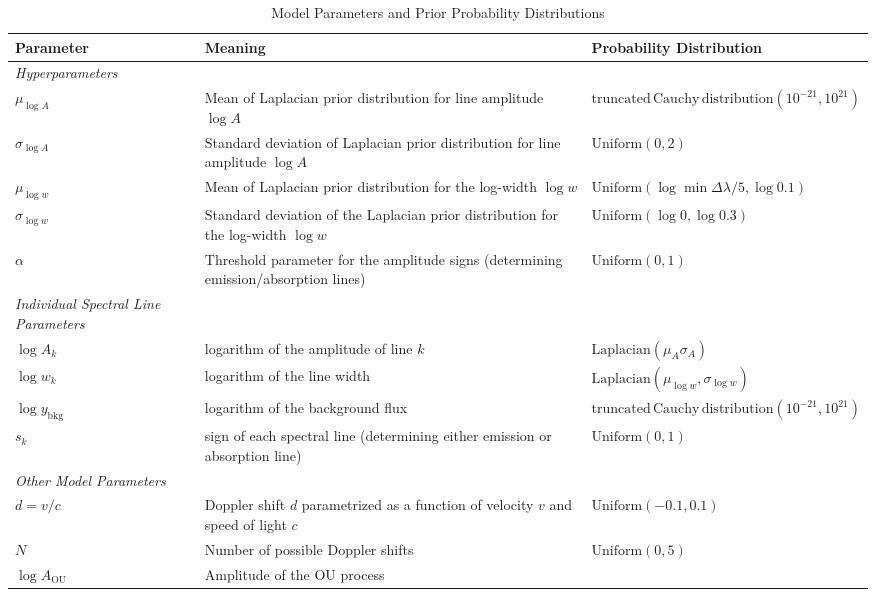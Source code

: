 \documentclass[12pt]{emulateapj}
\newcommand{\counts}{y}
\begin{document}
\begin{table*}[hbtp]
\renewcommand{\arraystretch}{1.3}
\footnotesize
\caption{Model Parameters and Prior Probability Distributions}
\begin{threeparttable} 
\begin{tabularx}{\textwidth}{p{4.0cm}p{7.0cm}X}
\toprule
\bf{Parameter} & \bf{Meaning} & \bf{Probability Distribution} \\ \midrule
\it{Hyperparameters} && \\ \midrule
$\mu_{\log{A}}$ & Mean of Laplacian prior distribution for line amplitude $\log{A}$ &   $\mathrm{truncated\, Cauchy\, distribution}(10^{-21}, 10^{21})$  \\
$\sigma_{\log{A}}$ & Standard deviation of Laplacian prior distribution for line amplitude $\log{A}$ & $\mathrm{Uniform}(0,2)$ \\
$\mu_{\log{w}}$ & Mean of Laplacian prior distribution for the log-width $\log{w}$ & $\mathrm{Uniform}(\log{\min{\Delta\lambda}/5}, \log{0.1})$  \\
$\sigma_{\log{w}}$ & Standard deviation of the Laplacian prior distribution for the log-width $\log{w}$ & $\mathrm{Uniform}(\log{0}, \log{0.3})$\\ 
$\alpha$ & Threshold parameter for the amplitude signs (determining emission/absorption lines) &  $\mathrm{Uniform}(0,1)$\\
\midrule
\it{Individual Spectral Line Parameters} && \\ \midrule
$\log{A_k}$ & logarithm of the amplitude of line $k$ & $\mathrm{Laplacian}(\mu_A \sigma_A)$ \\
$\log{w_k}$ & logarithm of the line width & $\mathrm{Laplacian}(\mu_{\log{w}}, \sigma_{\log{w}})$ \\
$\log{\counts}_{\mathrm{bkg}}$ & logarithm of the background flux & $\mathrm{truncated\, Cauchy\, distribution}(10^{-21}, 10^{21})$ \\
$s_k$ & sign of each spectral line (determining either emission or absorption line) &  $\mathrm{Uniform}(0,1)$\\
\midrule
\it{Other Model Parameters} && \\ \midrule
$d = v/c$ & Doppler shift $d$ parametrized as a function of velocity $v$ and speed of light $c$ & $\mathrm{Uniform}(-0.1, 0.1)$ \\
$N$ & Number of possible Doppler shifts & $\mathrm{Uniform}(0,5)$  \\
$\log{A_{\mathrm{OU}}}$ & Amplitude of the OU process & \\

\end{tabularx}
\end{threeparttable}
\end{table*}
\end{document}
